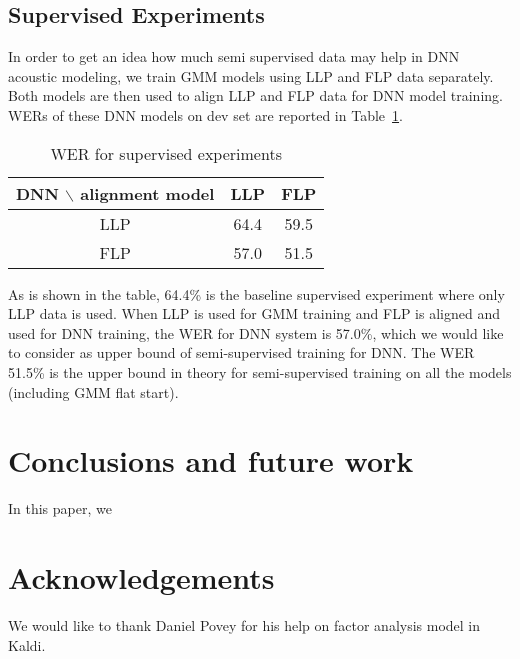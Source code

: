 \documentclass[a4paper]{article}
\begin{document}
\subsection{Supervised Experiments}
In order to get an idea how much semi supervised data may help in DNN acoustic modeling, we train GMM models using 
LLP and FLP data separately. Both models are then used to align LLP and FLP data for DNN model training. 
WERs of these DNN models on dev set are reported in Table~\ref{tab:sup}.

\begin{table}[htb]
  \centering
  \begin{tabular}{ccc}
    \hline
     DNN $\backslash$ alignment model & LLP     & FLP \\
     \hline
     LLP                  & 64.4    & 59.5 \\
     FLP                  & 57.0    & 51.5 \\
     \hline
  \end{tabular}
  \caption {WER for supervised experiments}
  \label{tab:sup}
\end{table}

As is shown in the table, 64.4\% is the baseline supervised experiment where only LLP data is used. 
When LLP is used for GMM training and FLP is aligned and used for DNN training, the WER for DNN system is 57.0\%, 
which we would like to consider as upper bound of semi-supervised training for DNN. 
The WER 51.5\% is the upper bound in theory for semi-supervised training on all the models (including GMM flat start).



\section{Conclusions and future work}
\label{sec:conclusion}
In this paper, we 


\section{Acknowledgements}
We would like to thank Daniel Povey for his help on factor analysis model in Kaldi.

  


\end{document}
